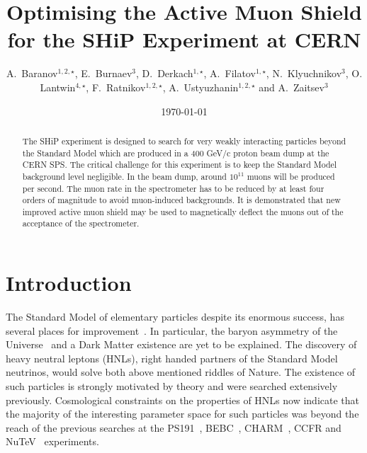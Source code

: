 \documentclass[a4paper]{jpconf}
\theoremstyle{my_theorem_style}
\numberwithin{equation}{section}
\begin{document}
\title{Optimising the Active Muon Shield for the SHiP Experiment at CERN}
\author{A.~Baranov$^{1,2,\star}$, E.~Burnaev$^{3}$,  D.~Derkach$^{1,\star}$, A.~Filatov$^{1,\star}$,
  N.~Klyuchnikov$^{3}$,  O. Lantwin$^{4,\star}$, F.~Ratnikov$^{1,2,\star}$,
  A.~Ustyuzhanin$^{1,2,\star}$  and
 A.~Zaitsev$^{3}$
}
\address{$^1$ National Research University Higher School of Economics,  Moscow, Russia \\
$^2$ Yandex School of Data Analysis, Moscow, Russia \\
$^3$ Skolkovo Institute of Science and Technology, Moscow, Russia \\
$^4$ Imperial College London, London, UK \\
$^\star$ on behalf of the SHiP Collaboration}

\begin{abstract}
The SHiP experiment is designed to search for very weakly interacting
particles beyond the Standard Model which are produced in a 400 GeV/c
proton beam dump at the CERN SPS. The critical challenge for this
experiment is to keep the Standard Model background level
negligible. In the beam dump, around $10^{11}$ muons will be produced
per second. The muon rate in the spectrometer has to be reduced by at
least four orders of magnitude to avoid muon-induced backgrounds. It
is demonstrated that new improved active muon shield may be used to magnetically deflect the muons out of the acceptance of the spectrometer.
\end{abstract}

\date{\today}



\section{Introduction}
\label{intro}
The Standard Model of elementary particles despite its enormous
success, has several places for improvement~\cite{Ellis:2009tp}. In
particular, the baryon asymmetry of the Universe~\cite{Asaka:2005pn}
and a Dark Matter existence are yet to be explained. 
The discovery of heavy neutral leptons (HNLs), right handed partners
of the Standard Model neutrinos, would solve both above mentioned riddles of Nature.
The existence of such particles is strongly motivated by theory and were searched extensively previously. Cosmological constraints on the properties of HNLs now indicate that the majority of the interesting parameter space for such particles was beyond the reach of the previous searches at the PS191~\cite{Bernardi:1985ny}, BEBC~\cite{CooperSarkar:1985nh}, CHARM~\cite{Bergsma:1985is}, CCFR and NuTeV~\cite{Vaitaitis:1999wq} experiments. 
\end{document}

